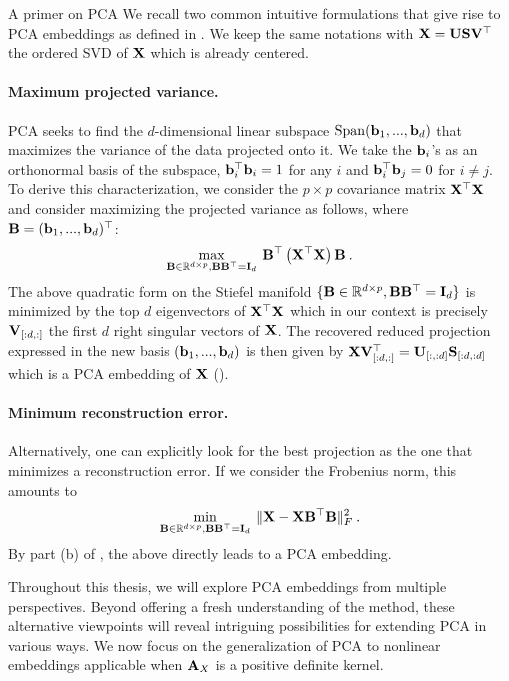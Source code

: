 \begin{mem1}{A primer on PCA}\label{memo:PCA}
	We recall two common intuitive formulations that give rise to PCA embeddings as defined in . We keep the same notations with ${\mathbf{X}} = {\mathbf{U}} {\mathbf{S}} {\mathbf{V}}^\top$ the ordered SVD of ${\mathbf{X}}$ which is already centered.

	\paragraph{Maximum projected variance.} PCA seeks to find the $d$-dimensional linear subspace $\mathrm{Span}({\mathbf{b}}_1, ..., {\mathbf{b}}_d)$ that maximizes the variance of the data projected onto it. We take the ${\mathbf{b}}_i$'s as an orthonormal basis of the subspace, \ie ${\mathbf{b}}_i^\top {\mathbf{b}}_i = 1$ for any $i$ and ${\mathbf{b}}_i^\top {\mathbf{b}}_j = 0$ for $i \neq j$.
	To derive this characterization, we consider the $p \times p$ covariance matrix ${\mathbf{X}}^\top {\mathbf{X}}$ and consider maximizing the projected variance as follows, where ${\mathbf{B}} = ({\mathbf{b}}_1, ..., {\mathbf{b}}_d)^\top$:
	\begin{align}
		\max_{{\mathbf{B}} \in \mathbb{R}^{d \times p}, {\mathbf{B}} {\mathbf{B}}^\top = {\mathbf{I}}_d} \: {\mathbf{B}}^\top \left({\mathbf{X}}^\top {\mathbf{X}} \right) {\mathbf{B}} \:.
	\end{align}
	The above quadratic form on the Stiefel manifold $\{{\mathbf{B}} \in \mathbb{R}^{d \times p}, {\mathbf{B}} {\mathbf{B}}^\top = {\mathbf{I}}_d \}$ is minimized by the top $d$ eigenvectors of ${\mathbf{X}}^\top {\mathbf{X}}$ \citep{absil2008optimization} which in our context is precisely ${\mathbf{V}}_{[:d,:]}$ the first $d$ right singular vectors of ${\mathbf{X}}$. The recovered reduced projection expressed in the new basis $({\mathbf{b}}_1, ..., {\mathbf{b}}_d)$ is then given by ${\mathbf{X}} {\mathbf{V}}_{[:d,:]}^\top = {\mathbf{U}}_{[:,:d]} {\mathbf{S}}_{[:d,:d]}$ which is a PCA embedding of ${\mathbf{X}}$ ().

	\paragraph{Minimum reconstruction error.} Alternatively, one can explicitly look for the best projection as the one that minimizes a reconstruction error. If we consider the Frobenius norm, this amounts to 
	\begin{align}
		\min_{{\mathbf{B}} \in \mathbb{R}^{d \times p}, {\mathbf{B}} {\mathbf{B}}^\top = {\mathbf{I}}_d} \: \| {\mathbf{X}} - {\mathbf{X}} {\mathbf{B}}^\top {\mathbf{B}} \|_F^2 \:.
	\end{align}
	By part (b) of , the above directly leads to a PCA embedding.
\end{mem1}
	
Throughout this thesis, we will explore PCA embeddings from multiple perspectives. Beyond offering a fresh understanding of the method, these alternative viewpoints will reveal intriguing possibilities for extending PCA in various ways. We now focus on the generalization of PCA to nonlinear embeddings applicable when ${\mathbf{A}}_{X}$ is a positive definite kernel.

